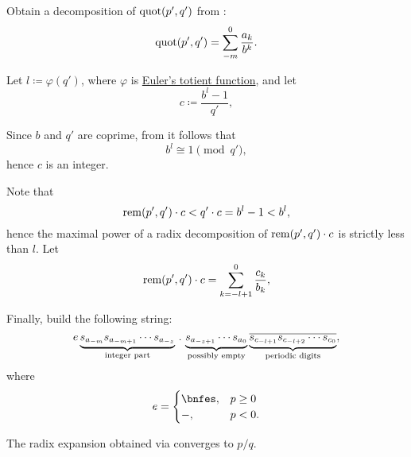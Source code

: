 \begin{algorithm}
\begin{thmenum}
     Obtain a decomposition of \( \operatorname{quot}(p', q') \) from :
    \begin{equation}\label{eq:alg:rational_number_to_positional_string/int}
      \operatorname{quot}(p', q') = \sum_{-m}^0 \frac {a_k} {b^k}.
    \end{equation}

     Let \( l \coloneqq \varphi(q') \), where \( \varphi \) is \hyperref[def:eulers_totient_function]{Euler's totient function}, and let
    \begin{equation}\label{eq:alg:rational_number_to_positional_string/periodic/c}
      c \coloneqq \frac {b^l - 1} {q'},
    \end{equation}

    Since \( b \) and \( q' \) are coprime, from  it follows that
    \begin{equation*}
      b^l \cong 1 \pmod {q'},
    \end{equation*}
    hence \( c \) is an integer.

    Note that
    \begin{equation}\label{eq:alg:rational_number_to_positional_string/periodic/digit_inequality}
      \operatorname{rem}(p', q') \cdot c < q' \cdot c = b^l - 1 < b^l,
    \end{equation}
    hence the maximal power of a radix decomposition of \( \operatorname{rem}(p', q') \cdot c \) is strictly less than \( l \). Let
    \begin{equation}\label{eq:alg:rational_number_to_positional_string/periodic}
      \operatorname{rem}(p', q') \cdot c = \sum_{k={-l+1}}^0 \frac {c_k} {b_k},
    \end{equation}

     Finally, build the following string:
    \begin{equation}\label{eq:alg:rational_number_to_positional_string/string}
      e \underbrace{s_{a_{-m}} s_{a_{-m+1}} \cdots s_{a_{-z}}}_{\T{integer part}} \thinspace . \thinspace \underbrace{s_{a_{-z+1}} \cdots s_{a_0}}_{\T{possibly empty}} \underbrace{\oline{s_{c_{-l+1}} s_{c_{-l+2}} \cdots s_{c_0}}}_{\T{periodic digits}},
    \end{equation}
    where
    \begin{equation*}
      e = \begin{cases}
        \bnfes, &p \geq 0 \\
        -,      &p < 0.
      \end{cases}
    \end{equation*}

    The radix expansion obtained via  converges to \( p / q \).
  \end{thmenum}
\end{algorithm}
